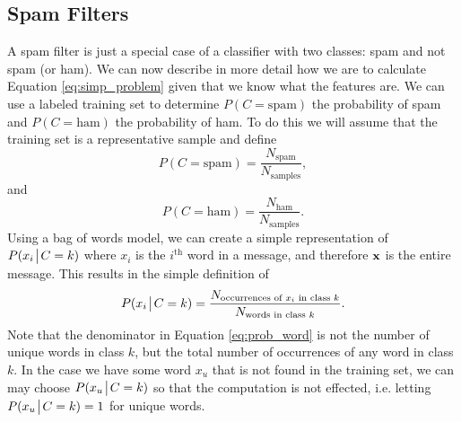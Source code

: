 \subsection*{Spam Filters}
A spam filter is just a special case of a classifier with two classes: spam and not spam (or ham). 
We can now describe in more detail how we are to calculate Equation \ref{eq:simp_problem} given that we know what the features are.
We can use a labeled training set to determine $P(C=\text{spam})$ the probability of spam and $P(C=\text{ham})$ the probability of ham.
To do this we will assume that the training set is a representative sample and define
\begin{equation}\label{eq:prob_spam}
    P(C=\text{spam}) = \frac{N_{\text{spam}}}{N_{\text{samples}}},
\end{equation}
and 
\begin{equation}\label{eq:prob_ham}
    P(C=\text{ham}) = \frac{N_{\text{ham}}}{N_{\text{samples}}}.
\end{equation}
Using a bag of words model, we can create a simple representation of $P(x_i \!\mathrel{\big|}\! C=k)$ where $x_i$ is the $i^{\text{th}}$ word in a message, and therefore $\mathbf{x}$ is the entire message. This results in the simple definition of 
\begin{equation}\label{eq:prob_word}
    P(x_i \!\mathrel{\big|}\! C=k) = \frac{N_{\text{occurrences of $x_i$ in class $k$}}}{N_{\text{words in class $k$}}}.
\end{equation}
Note that the denominator in Equation \ref{eq:prob_word} is not the number of unique words in class $k$, but the total number of occurrences of any word in class $k$.
In the case we have some word $x_u$ that is not found in the training set, we can may choose $P(x_u \!\mathrel{\big|}\! C=k)$ so that the computation is not effected, i.e. letting $P(x_u \!\mathrel{\big|}\! C=k) = 1$ for unique words.



